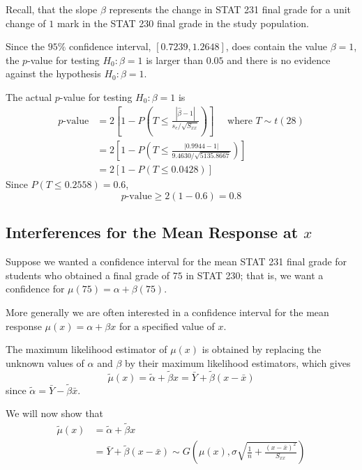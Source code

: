 Recall, that the slope $ \beta $ represents the change in STAT 231 final grade
for a unit change of $ 1 $ mark in the STAT 230 final grade in the study population.
\begin{exbox}
    \begin{example}[Testing $ H_0:\beta=1 $ for STAT 230/231 Final Grades]
        Since the $ 95\% $ confidence interval, $ \left[ 0.7239,1.2648 \right] $,
        does contain the value $ \beta=1 $, the $ p $-value for testing
        $ H_0:\beta=1 $ is larger than $ 0.05 $ and there is no evidence against the hypothesis
        $ H_0:\beta=1 $.

        The actual $ p $-value for testing $ H_0:\beta=1 $ is
        \[
            \begin{aligned}
                p\text{-value}
                 & =2\left[1-P\left(T \leq \frac{|\hat{\beta}-1|}{s_{e} / \sqrt{S_{x x}}}\right)\right]
                \quad \text { where } T \sim t(28)                                                      \\
                 & =2\left[1-P\left(T \leq \frac{|0.9944-1|}{9.4630 / \sqrt{5135.8667}}\right)\right]   \\
                 & =2[1-P(T \leq 0.0428)]
            \end{aligned}
        \]
        Since $ P(T\leqslant 0.2558)=0.6 $,
        \[ p\text{-value}\geqslant 2(1-0.6)=0.8 \]
    \end{example}
\end{exbox}

\subsection{Interferences for the Mean Response at $ x $}
Suppose we wanted a confidence interval for the mean STAT 231 final grade for students
who obtained a final grade of $ 75 $ in STAT 230; that is, we want a confidence
for $ \mu(75)=\alpha+\beta(75) $.

More generally we are often interested in a confidence interval for the mean
response $ \mu(x)=\alpha+\beta x $ for a specified value of $ x $.

The maximum likelihood estimator of $ \mu(x) $ is obtained by replacing the unknown
values of $ \alpha $ and $ \beta $ by their maximum likelihood estimators,
which gives
\[\tilde{\mu}(x)
    =\tilde{\alpha}+\tilde{\beta} x
    =\bar{Y}+\tilde{\beta}(x-\bar{x})\]
since $ \tilde{\alpha}=\bar{Y}-\tilde{\beta}\bar{x} $.

We will now show that
\[
    \begin{aligned}
        \tilde{\mu}(x)
         & =\tilde{\alpha}+\tilde{\beta}x                                      \\
         & =\bar{Y}+\tilde{\beta}\left( x-\bar{x} \right) \sim G\left( \mu(x),
        \sigma \sqrt{\frac{1}{n}+\frac{\left( x-\bar{x} \right)^2}{S_{xx}}} \right)
    \end{aligned}
\]

